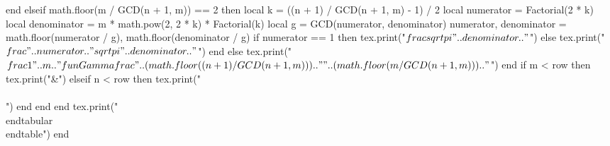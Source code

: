 \documentclass[a4paper,draft]{ltjsarticle}
\begin{document}
\begin{luacode*}
                    end
                elseif math.floor(m / GCD(n + 1, m)) == 2 then
                    local k = ((n + 1) / GCD(n + 1, m) - 1) / 2
                    local numerator = Factorial(2 * k)
                    local denominator = m * math.pow(2, 2 * k) * Factorial(k)
                    local g = GCD(numerator, denominator)
                    numerator, denominator = math.floor(numerator / g), math.floor(denominator / g)
                    if numerator == 1 then
                        tex.print("$\\frac{\\sqrt{\\pi}}{"..denominator.."}$")
                    else
                        tex.print("$\\frac{"..numerator.."\\sqrt{\\pi}}{"..denominator.."}$")
                    end
                else
                    tex.print("$\\frac{1}{"..m.."} \\fun{\\Gamma}{\\frac{"..(math.floor((n + 1) / GCD(n + 1, m))).."}{"..(math.floor(m / GCD(n + 1, m))).."}}$")
                end
                if m < row then
                    tex.print("&")
                elseif n < row then
                    tex.print("\\\\")
                end
            end
        end
        tex.print("\\end{tabular}\\end{table}")
    end
\end{luacode*}


\begin{landscape}
\end{landscape}
\end{document}
